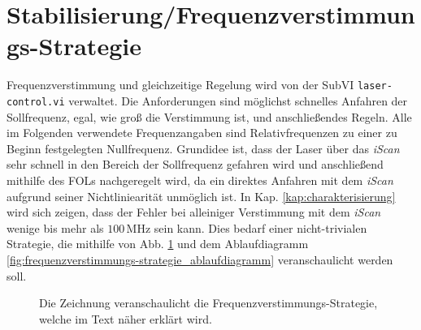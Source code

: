 \section{Stabilisierung/Frequenzverstimmungs-Strategie}\label{sec:stabilisierung_frequenzverstimmungs-strategie}
Frequenzverstimmung und gleichzeitige Regelung wird von der SubVI
\lstinline|laser-control.vi| verwaltet. Die Anforderungen sind möglichst
schnelles Anfahren der Sollfrequenz, egal, wie groß die Verstimmung ist, und
anschließendes Regeln. Alle im Folgenden verwendete Frequenzangaben sind
Relativfrequenzen zu einer zu Beginn festgelegten Nullfrequenz. Grundidee ist,
dass der Laser über das \textit{iScan} sehr schnell in den Bereich der
Sollfrequenz gefahren wird und anschließend mithilfe des FOLs nachgeregelt wird,
da ein direktes Anfahren mit dem \textit{iScan} aufgrund seiner Nichtliniearität unmöglich ist. In Kap. \ref{kap:charakterisierung} wird sich zeigen, dass der Fehler bei
alleiniger Verstimmung mit dem \textit{iScan} wenige bis mehr als $100\,$MHz sein kann.
Dies bedarf einer nicht-trivialen Strategie, die mithilfe von Abb.
\ref{fig:frequenzverstimmungs-strategie} und dem Ablaufdiagramm
\ref{fig:frequenzverstimmungs-strategie_ablaufdiagramm} veranschaulicht werden
soll.\par
\begin{figure}[h]
 	\centering
	\caption[Frequenzverstimmungs-Strategie]{Die
	Zeichnung veranschaulicht die Frequenzverstimmungs-Strategie,
	welche im Text näher erklärt wird.}\label{fig:frequenzverstimmungs-strategie}
\end{figure}
